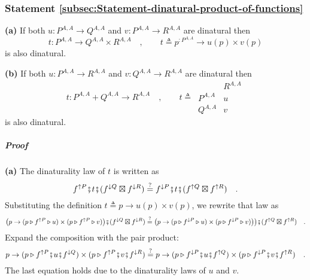 \subsubsection{Statement \label{subsec:Statement-dinatural-product-of-functions}\ref{subsec:Statement-dinatural-product-of-functions}}

\textbf{(a)} If both $u:P^{A,A}\rightarrow Q^{A,A}$ and $v:P^{A,A}\rightarrow R^{A,A}$
are dinatural then 
\[
t:P^{A,A}\rightarrow Q^{A,A}\times R^{A,A}\quad,\quad\quad t\triangleq p^{:P^{A,A}}\rightarrow u(p)\times v(p)
\]
is also dinatural. 

\textbf{(b)} If both $u:P^{A,A}\rightarrow R^{A,A}$ and $v:Q^{A,A}\rightarrow R^{A,A}$
are dinatural then
\[
t:P^{A,A}+Q^{A,A}\rightarrow R^{A,A}\quad,\quad\quad t\triangleq\,\begin{array}{|c||c|}
 & R^{A,A}\\
\hline P^{A,A} & u\\
Q^{A,A} & v
\end{array}
\]
is also dinatural.

\subparagraph{Proof}

\textbf{(a)} The dinaturality law of $t$ is written as
\[
f^{\uparrow P}\bef t\bef(f^{\downarrow Q}\boxtimes f^{\downarrow R})\overset{?}{=}f^{\downarrow P}\bef t\bef(f^{\uparrow Q}\boxtimes f^{\uparrow R})\quad.
\]
Substituting the definition $t\triangleq p\rightarrow u(p)\times v(p)$,
we rewrite that law as
\[
\big(p\rightarrow(p\triangleright f^{\uparrow P}\triangleright u)\times(p\triangleright f^{\uparrow P}\triangleright v)\big)\bef(f^{\downarrow Q}\boxtimes f^{\downarrow R})\overset{?}{=}\big(p\rightarrow(p\triangleright f^{\downarrow P}\triangleright u)\times(p\triangleright f^{\downarrow P}\triangleright v)\big)\big)\bef(f^{\uparrow Q}\boxtimes f^{\uparrow R})\quad.
\]
Expand the composition with the pair product:
\[
p\rightarrow(p\triangleright f^{\uparrow P}\bef u\bef f^{\downarrow Q})\times(p\triangleright f^{\uparrow P}\bef v\bef f^{\downarrow R})\overset{?}{=}p\rightarrow(p\triangleright f^{\downarrow P}\bef u\bef f^{\uparrow Q})\times(p\triangleright f^{\downarrow P}\bef v\bef f^{\uparrow R})\quad.
\]
The last equation holds due to the dinaturality laws of $u$ and $v$.

